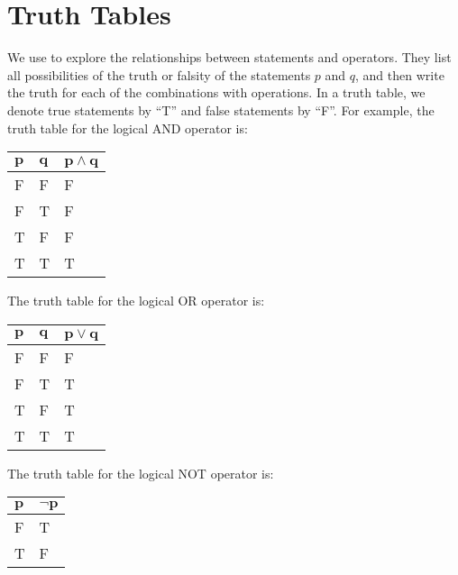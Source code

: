 \section{Truth Tables}
We use  to explore the relationships between statements and operators. They list all possibilities of the truth or falsity of the statements $p$ and $q$, and then write the truth for each of the combinations with operations. In a truth table, we denote true statements by ``T'' and false statements by ``F''. For example, the truth table for the logical AND operator is:
\begin{table}[h]
    \centering
    \begin{tabular}{|l|l||l|}
        \hline
        $\boldsymbol{p}$ & $\boldsymbol{q}$ & $\boldsymbol{p \land q}$ \\ \hline
        F   & F   & F          \\ \hline
        F   & T   & F          \\ \hline
        T   & F   & F          \\ \hline
        T   & T   & T          \\ \hline
    \end{tabular}
\end{table}

The truth table for the logical OR operator is:
\begin{table}[h]
    \centering
    \begin{tabular}{|l|l||l|}
        \hline
        $\boldsymbol{p}$ & $\boldsymbol{q}$ & $\boldsymbol{p \lor q}$ \\ \hline
        F   & F   & F         \\ \hline
        F   & T   & T         \\ \hline
        T   & F   & T         \\ \hline
        T   & T   & T         \\ \hline
    \end{tabular}
\end{table}

The truth table for the logical NOT operator is:
\begin{table}[h]
    \centering
    \begin{tabular}{|l||l|}
        \hline
        $\boldsymbol{p}$ & $\boldsymbol{\lnot p}$ \\ \hline
        F   & T         \\ \hline
        T   & F         \\ \hline
    \end{tabular}
\end{table}

